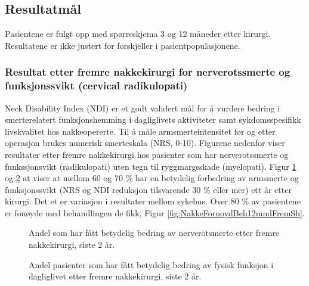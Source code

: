 \documentclass [norsk,a4paper,twoside]{article}\usepackage[]{graphicx}\usepackage[]{color}
\begin{document}
\clearpage

\subsection{Resultatmål}

Pasientene er fulgt opp med spørreskjema 3 og 12 måneder etter kirurgi.
Resultatene er ikke justert for forskjeller i pasientpopulasjonene.


\subsubsection{Resultat etter fremre nakkekirurgi for nerverotssmerte og funksjonssvikt (cervical radikulopati)}




Neck Disability Index (NDI) er et godt validert mål for å vurdere bedring i smerterelatert
funksjonshemming  i dagliglivets aktiviteter samt sykdomsspesifikk livskvalitet hos 
nakkeopererte. Til å måle armsmerteintensitet før og etter operasjon brukes numerisk 
smerteskala (NRS, 0-10). Figurene nedenfor viser resultater etter fremre nakkekirurgi hos 
pasienter som har nerverotssmerte og funkssjonsvikt (radikulopati) uten tegn til 
ryggmargsskade 
(myelopati). Figur \ref{fig:NakkeNRSsmerteArmEndr12mndUmFSh} og  
\ref{fig:NakkeNDIendr12mndUmFSh} at viser at mellom 60 og 70 \% har en betydelig forbedring av 
armsmerte og funksjonssvikt (NRS og NDI reduksjon tilsvarende 30 \%  eller mer) ett år etter 
kirurgi. Det et er variasjon i resultater mellom sykehus. Over 80 \% av pasientene er fonøyde 
med behandlingen de fikk, Figur \ref{fig:NakkeFornoydBeh12mndFremSh}.  





\begin{figure}[ht]
\caption{\label{fig:NakkeNRSsmerteArmEndr12mndUmFSh} Andel som har fått betydelig bedring av nerverotsmerte  etter fremre nakkekirurgi, siste 2 år.}
\end{figure}

\begin{figure}[ht]
\caption{\label{fig:NakkeNDIendr12mndUmFSh} Andel pasienter som har fått betydelig bedring av fysisk funksjon i dagliglivet etter fremre nakkekirurgi, siste 2 år.}
\end{figure}
\end{document}
